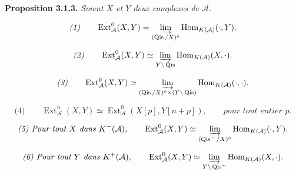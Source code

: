 \medskip\noindent\textbf{Proposition 3.1.3.}\quad
\textit{Soient $X$ et $Y$ deux complexes de $\mathcal A$.}

\[
\textit{(1)}\qquad
\operatorname{Ext}_{\mathcal A}^{0}(X,Y)=
\varinjlim_{(\operatorname{Qis}/X)^o}
\operatorname{Hom}_{K(\mathcal A)}(\mathord\cdot,Y).
\]

\[
\textit{(2)}\qquad
\operatorname{Ext}_{\mathcal A}^{0}(X,Y)\simeq
\varinjlim_{Y\backslash\operatorname{Qis}}
\operatorname{Hom}_{K(\mathcal A)}(X,\mathord\cdot).
\]

\[
\textit{(3)}\qquad
\operatorname{Ext}_{\mathcal A}^{0}(X,Y)\simeq
\varinjlim_{(\operatorname{Qis}/X)^o\times
  (Y\backslash\operatorname{Qis})}
\operatorname{Hom}_{K(\mathcal A)}(\mathord\cdot,\mathord\cdot).
\]

\[
\textit{(4)}\qquad
\operatorname{Ext}_{\mathcal A}^{n}(X,Y)\simeq
\operatorname{Ext}_{\mathcal A}^{0}(X[p],Y[n+p]),
\qquad\textit{pour tout entier $p$.}
\]

\[
\textit{(5) Pour tout $X$ dans $K^{-}(\mathcal A)$,}\qquad
\operatorname{Ext}_{\mathcal A}^{0}(X,Y)\simeq
\varinjlim_{(\operatorname{Qis}^{-}/X)^o}
\operatorname{Hom}_{K(\mathcal A)}(\mathord\cdot,Y).
\]

\[
\textit{(6) Pour tout $Y$ dans $K^{+}(\mathcal A)$,}\qquad
\operatorname{Ext}_{\mathcal A}^{0}(X,Y)\simeq
\varinjlim_{Y\backslash\operatorname{Qis}^{+}}
\operatorname{Hom}_{K(\mathcal A)}(X,\mathord\cdot).
\]
\endgroup
